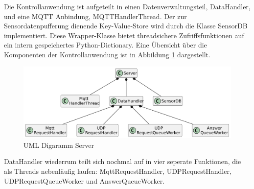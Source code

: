 \documentclass[11pt,a4paper]{report}
\begin{document}
Die Kontrollanwendung ist aufgeteilt in einen Datenverwaltungsteil, DataHandler, und eine MQTT Anbindung, MQTTHandlerThread.
Der zur Sensordatenpufferung dienende Key-Value-Store wird durch die Klasse SensorDB implementiert.
Diese Wrapper-Klasse bietet threadsichere Zufriffsfunktionen auf ein intern gespeichertes Python-Dictionary.
Eine Übersicht über die Komponenten der Kontrollanwendung ist in Abbildung \ref{fig:serverUml} dargestellt.
\begin{figure}[htbp]
  \centering
  \includegraphics[width=\textwidth]{images/ServerUml}
  \caption{UML Digaramm Server}
  \label{fig:serverUml}
\end{figure}
DataHandler wiederrum teilt sich nochmal auf in vier seperate Funktionen, die als Threads nebenläufig laufen: MqttRequestHandler, UDPRequestHandler, UDPRequestQueueWorker und AnswerQueueWorker.
\end{document}
